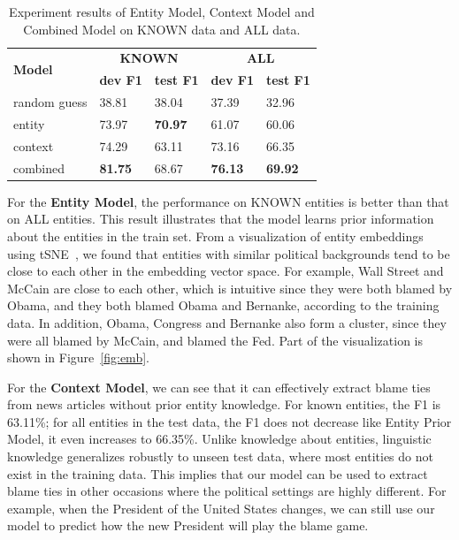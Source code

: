 \documentclass[letterpaper]{article}
\begin{document}
\begin{table}[t]
\centering
\begin{tabular}{l | p{1cm} p{1cm} | p{1cm} p{1cm}} 
\hline
\multirow{2}{2pt}{\bf Model} & \multicolumn{2}{c}{\bf KNOWN}  & \multicolumn{2}{c}{\bf ALL} \\
 & {\bf dev F1 } & {\bf test F1} & {\bf dev F1 } & {\bf test F1 } \\
\hline\hline
random guess & 38.81 & 38.04 & 37.39 & 32.96 \\
\hline
entity & 73.97 & {\bf 70.97} & 61.07 & 60.06 \\ 
\hline
context & 74.29  & 63.11 & 73.16 & 66.35 \\
\hline
combined & {\bf 81.75}  & 68.67 & {\bf 76.13}  & {\bf 69.92} \\
\hline
\end{tabular}
\caption{Experiment results of Entity Model, Context Model and Combined Model on KNOWN data and ALL data.}
\label{table:finalresult}
\end{table}

For the \textbf{Entity Model}, the performance on KNOWN entities is better than that on ALL entities. This result illustrates that the model learns prior information about the entities in the train set. From a visualization of entity embeddings using tSNE~\cite{maaten2008visualizing}, we found that entities with similar political backgrounds tend to be close to each other in the embedding vector space. For example, Wall Street and McCain are close to each other, which is intuitive since they were both blamed by Obama, and they both blamed Obama and Bernanke, according to the training data. In addition, Obama, Congress and Bernanke also form a cluster, since they were all blamed by McCain, and blamed the Fed. Part of the visualization is shown in Figure~\ref{fig:emb}.

For the \textbf{Context Model}, we can see that it can effectively extract blame ties from news articles without prior entity knowledge. For known entities, the F1 is 63.11\%; for all entities in the test data, the F1 does not decrease like Entity Prior Model, it even increases to 66.35\%. Unlike knowledge about entities, linguistic knowledge generalizes robustly to unseen test data, where most entities do not exist in the training data. This implies that our model can be used to extract blame ties in other occasions where the political settings are highly different. For example, when the President of the United States changes, we can still use our model to predict how the new President will play the blame game.
\end{document}
